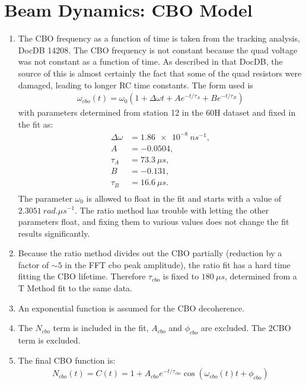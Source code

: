 \section{Beam Dynamics: CBO Model}

\begin{enumerate}
	\item{The CBO frequency as a function of time is taken from the tracking analysis, DocDB 14208. The CBO frequency is not constant because the quad voltage was not constant as a function of time. As described in that DocDB, the source of this is almost certainly the fact that some of the quad resistors were damaged, leading to longer RC time constants. The form used is 
		\begin{gather}
			\omega_{cbo}(t) = \omega_{0}(1 + \Delta\omega t + A e^{-t/\tau_{A}} + B e^{-t/\tau_{B}})
		\end{gather}
	with parameters determined from station 12 in the 60H dataset and fixed in the fit as:
		\begin{equation*}	
		\begin{aligned}
		 	\Delta\omega &= \SI{1.86e-8}{ns^{-1}}, \\
		 	A &= -0.0504, \\
		 	\tau_{A} &= \SI{73.3}{\mu s}, \\
		 	B &= -0.131, \\
		 	\tau_{B} &= \SI{16.6}{\mu s}. \\
		\end{aligned}
		\end{equation*}
	The parameter $\omega_{0}$ is allowed to float in the fit and starts with a value of $\SI{2.3051}{rad.\mu s^{-1}}$. The ratio method has trouble with letting the other parameters float, and fixing them to various values does not change the fit results significantly.}
	\item{Because the ratio method divides out the CBO partially (reduction by a factor of $\sim5$ in the FFT cbo peak amplitude), the ratio fit has a hard time fitting the CBO lifetime. Therefore $\tau_{cbo}$ is fixed to $\SI{180}{\mu s}$, determined from a T Method fit to the same data.}
	\item{An exponential function is assumed for the CBO decoherence.}
	\item{The $N_{cbo}$ term is included in the fit, $A_{cbo}$ and $\phi_{cbo}$ are excluded. The 2CBO term is excluded.}
	\item{The final CBO function is:
		\begin{gather}
				N_{cbo}(t) = C(t) = 1 + A_{cbo} e^{-t/\tau_{cbo}} \cos(\omega_{cbo}(t)t + \phi_{cbo})
		\label{eqn:CBO}
		\end{gather}
	}
\end{enumerate}


